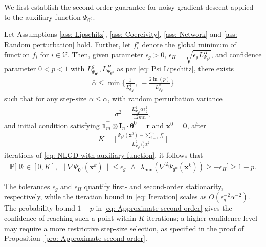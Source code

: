 \documentclass{siamart251216}
\begin{document}
We first establish the second-order guarantee for noisy gradient descent applied to the auxiliary function $\Psi_{\boldsymbol{\theta}^{0}}$.
\begin{proposition}
\label{pro: Approximate second order}
    Let Assumptions \ref{ass: Lipschitz}, \ref{ass: Coercivity}, \ref{ass: Network} and \ref{ass: Random perturbation} hold. Further, let $f_{i}^{\star}$ denote the global minimum of function $f_{i}$ for $i\in\mathcal{V}$. Then, given parameter $\epsilon_{g} > 0$, $\epsilon_{H} = \sqrt{\epsilon_{g}L_{\Psi_{\boldsymbol{\theta}^{0}}}^{H}}$, and confidence parameter $0 < p < 1$ with $L_{\Psi_{\boldsymbol{\theta}^{0}}}^{g},L_{\Psi_{\boldsymbol{\theta}^{0}}}^{H}$ as per \eqref{eq: Psi Lipschitz}, there exists
    \begin{gather}
    \label{eq: alpha bar}
        \bar{\alpha} \le \min\{\frac{1}{L_{\Psi_{\boldsymbol{\theta}^{0}}}^{g}},~-\frac{2\ln{(p)}}{L_{\Psi_{\boldsymbol{\theta}^{0}}}^{g}}\}
    \end{gather}
    such that for any step-size $\alpha \le \bar{\alpha}$, with random perturbation variance
    \begin{gather}
    \label{eq: Variance}
        \sigma^{2}=\frac{L_{\Psi_{\boldsymbol{\theta}^{0}}}^{g}\alpha\epsilon_{g}^{2}}{12mn},
    \end{gather}
    and initial condition satisfying $\bm{1}_{m}^{\top} \otimes \mathbf{I}_{n} \cdot \boldsymbol{\theta}^{0} = \bm{r}$ and $\mathbf{x}^{0} = \bm{0}$, after
    \begin{gather}
    \label{eq: Iteration}
        K = \lceil \frac{\Psi_{\boldsymbol{\theta}^{0}}(\mathbf{x}^{0}) - \sum_{i=1}^{m} f_{i}^{\star}}{L_{\Psi_{\boldsymbol{\theta}^{0}}}^{g} \epsilon_{g}^{2} \alpha^{2}} \rceil
    \end{gather}
    iterations of \eqref{eq: NLGD with auxiliary function}, it follows that
    \begin{gather}
    \label{eq: Approximate second order}
        \mathbb{P} \Bigg[\exists k \in [0,K],~\|\nabla \Psi_{\boldsymbol{\theta}^{0}}(\mathbf{x}^{k})\| \le\epsilon_{g}~~\land~~\lambda_{\min} (\nabla^{2} \Psi_{\boldsymbol{\theta}^{0}}(\mathbf{x}^{k})) \ge -\epsilon_{H}
        \Bigg] \ge 1 - p.
    \end{gather}
\end{proposition}

\begin{remark}
\label{re: Discussion}
    The tolerances $\epsilon_{g}$ and $\epsilon_{H}$ quantify first- and second-order stationarity, respectively, while the iteration bound in \eqref{eq: Iteration} scales as $O(\epsilon_{g}^{-2}\alpha^{-2})$. The probability bound $1-p$ in \eqref{eq: Approximate second order} gives the confidence of reaching such a point within $K$ iterations; a higher confidence level may require a more restrictive step-size selection, as specified in the proof of Proposition~\ref{pro: Approximate second order}.
\end{remark}
\end{document}
